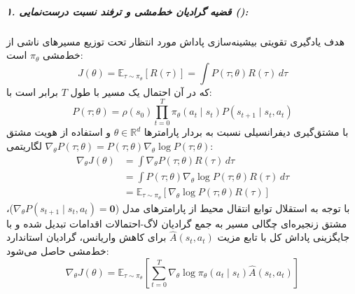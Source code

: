 \subparagraph*{۱. قضیه گرادیان خط‌مشی و ترفند نسبت درست‌نمایی ():}
هدف یادگیری تقویتی بیشینه‌سازی پاداش مورد انتظار تحت توزیع مسیرهای ناشی از خط‌مشی $\pi_\theta$ است:
\begin{equation}
    J(\theta) = \mathbb{E}_{\tau \sim \pi_\theta}[R(\tau)] = \int P(\tau; \theta) R(\tau) \, d\tau
\end{equation}
که در آن احتمال یک مسیر با طول $T$ برابر است با:
\begin{equation}
    P(\tau; \theta) = \rho(s_0) \prod_{t=0}^T \pi_\theta(a_t \mid s_t) P(s_{t+1} \mid s_t, a_t)
\end{equation}
با مشتق‌گیری دیفرانسیلی نسبت به بردار پارامترها $\theta \in \mathbb{R}^d$ و استفاده از هویت مشتق لگاریتمی $\nabla_\theta P(\tau; \theta) = P(\tau; \theta) \nabla_\theta \log P(\tau; \theta)$:
\begin{equation}
\begin{aligned}
    \nabla_\theta J(\theta) &= \int \nabla_\theta P(\tau; \theta) R(\tau) \, d\tau \\
    &= \int P(\tau; \theta) \nabla_\theta \log P(\tau; \theta) R(\tau) \, d\tau \\
    &= \mathbb{E}_{\tau \sim \pi_\theta} \left[ \nabla_\theta \log P(\tau; \theta) R(\tau) \right]
\end{aligned}
\end{equation}
با توجه به استقلال توابع انتقال محیط از پارامترهای مدل ($\nabla_\theta P(s_{t+1} \mid s_t, a_t) = \mathbf{0}$)، مشتق زنجیره‌ای چگالی مسیر به جمع گرادیان لاگ-احتمالات اقدامات تبدیل شده و با جایگزینی پاداش کل با تابع مزیت $\hat{A}(s_t, a_t)$ برای کاهش واریانس، گرادیان استاندارد خط‌مشی حاصل می‌شود:
\begin{equation}
    \nabla_\theta J(\theta) = \mathbb{E}_{\tau \sim \pi_\theta} \left[ \sum_{t=0}^T \nabla_\theta \log \pi_\theta(a_t \mid s_t) \hat{A}(s_t, a_t) \right]
\end{equation}


